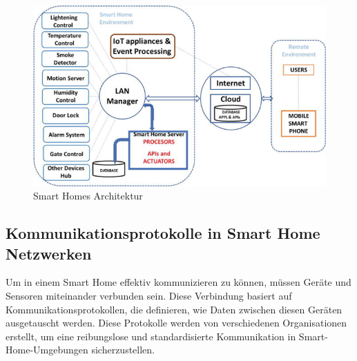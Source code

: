 \begin{figure}[h]
  \centering
  \includegraphics[scale=0.8]{resources/BuildinganIoT-basedarchitecturemodelforsmarthomes.png}
  \caption{Smart Homes Architektur \cite{djumanazarov2021overview}}
  \label{fig:Smart_Home}
\end{figure}

\subsection{Kommunikationsprotokolle in Smart Home Netzwerken}

Um in einem Smart Home effektiv kommunizieren zu können, müssen Geräte und Sensoren miteinander verbunden sein. Diese Verbindung basiert auf Kommunikationsprotokollen, die definieren, wie Daten zwischen diesen Geräten ausgetauscht werden. Diese Protokolle werden von verschiedenen Organisationen erstellt, um eine reibungslose und standardisierte Kommunikation in Smart-Home-Umgebungen sicherzustellen.

